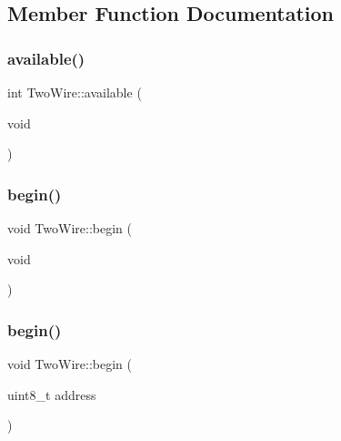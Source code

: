 \subsection{Member Function Documentation}
\mbox{\label{class_two_wire_aee57bc52bee06508e231c5fc6bc35ada}} 
\subsubsection{\texorpdfstring{available()}{available()}}
{\footnotesize\ttfamily int Two\+Wire\+::available (\begin{DoxyParamCaption}\item[{void}]{ }\end{DoxyParamCaption})\hspace{0.3cm}{\ttfamily [virtual]}}

\mbox{\label{class_two_wire_ada85a7a8663ec8af0a1248b659be2f18}} 
\subsubsection{\texorpdfstring{begin()}{begin()}\hspace{0.1cm}{\footnotesize\ttfamily [1/3]}}
{\footnotesize\ttfamily void Two\+Wire\+::begin (\begin{DoxyParamCaption}\item[{void}]{ }\end{DoxyParamCaption})}

\mbox{\label{class_two_wire_a28bca087ed188781ef15e72622d3b1fb}} 
\subsubsection{\texorpdfstring{begin()}{begin()}\hspace{0.1cm}{\footnotesize\ttfamily [2/3]}}
{\footnotesize\ttfamily void Two\+Wire\+::begin (\begin{DoxyParamCaption}\item[{uint8\+\_\+t}]{address }\end{DoxyParamCaption})}

\mbox{\label{class_two_wire_a2806aa5684d36d7d20bf7c51cab3e602}} 
